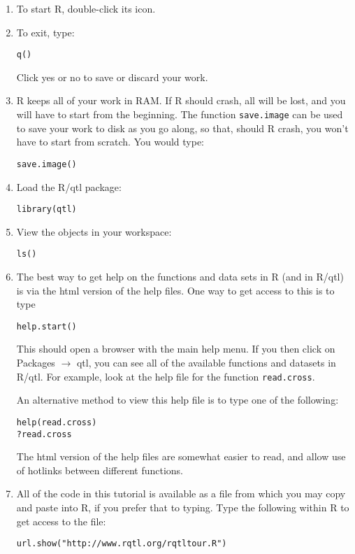\documentclass[10pt,letterpaper]{article}
\newcommand{\usercolor}{\color [named]{BlueViolet}}
\newcommand{\othercolor}{\color [named]{Mahogany}}
\begin{document}
\begin{enumerate}

\item To start R, double-click its icon.  

\item To exit, type:

\usercolor \verb-q()- \normalcolor

Click yes or no to save or discard your work.

\item R keeps all of your work in RAM.  If R should crash, all will be
  lost, and you will have to start from the beginning.  The function
  \verb-save.image- can be used to save your work to disk as you go
  along, so that, should R crash, you won't have to start from
  scratch.  You would type:

\usercolor \verb|save.image()| \normalcolor 

\item Load the R/qtl package:

\usercolor \verb|library(qtl)| \normalcolor

\item View the objects in your workspace:

\usercolor \verb|ls()| \normalcolor

\item The best way to get help on the functions and data sets in R
(and in R/qtl) is via the html version of the help files. One way to
get access to this is to type 

\usercolor \verb-help.start()- \normalcolor

This should open a browser with the main help menu.  
If you then click on \othercolor Packages \normalcolor $\rightarrow$
\othercolor qtl\normalcolor , you can see all of the available
functions and datasets in R/qtl.  For example, look at the help file
for the function \verb-read.cross-.

An alternative method to view this help file is to type one of the
following: 

\usercolor \verb|help(read.cross)| \\
\verb|?read.cross| \normalcolor

The html version of the help files are somewhat easier to read, and
allow use of hotlinks between different functions.  


\item All of the code in this tutorial is available as a file from
  which you may copy and paste into R, if you prefer that to typing.
  Type the following within R to get access to the file:

\usercolor \verb-url.show("http://www.rqtl.org/rqtltour.R")-
\normalcolor

\end{enumerate}
\end{document}
